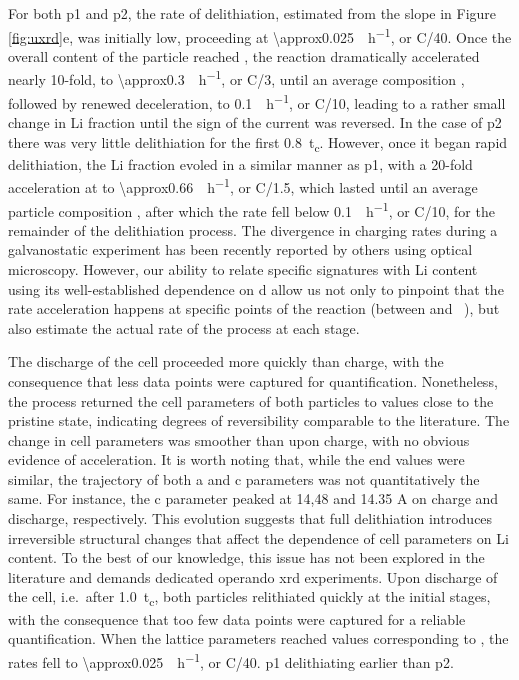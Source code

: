 \documentclass{article}
\begin{document}
For both \gls{p1} and \gls{p2}, the rate of delithiation, estimated
from the slope in Figure \ref{fig:uxrd}e, was initially low,
proceeding at \SI{\approx0.025}{\per\hour}, or C/40. Once the
overall content of the particle reached , the reaction
dramatically accelerated nearly 10-fold, to
\SI{\approx0.3}{\per\hour}, or C/3, until an average
composition , followed by renewed deceleration, to
\SI{0.1}{\per\hour}, or C/10, leading to a rather small change
in Li fraction until the sign of the current was reversed. In the case
of \gls{p2} there was very little delithiation for the first
\SI{0.8}{t_c}. However, once it began rapid delithiation, the Li
fraction evoled in a similar manner as \gls{p1}, with a 20-fold
acceleration at  to \SI{\approx0.66}{\per\hour}, or
C/1.5, which lasted until an average particle composition ,
after which the rate fell below \SI{0.1}{\per\hour}, or C/10,
for the remainder of the delithiation process. The divergence in
charging rates during a galvanostatic experiment has been recently
reported by others using optical microscopy\cite{zhao2022}. However, our ability to
relate specific signatures with Li content using its well-established
dependence on \gls{d} allow us not only to pinpoint that the rate
acceleration happens at specific points of the reaction (between
 and ~), but also estimate the actual rate of the
process at each stage.

The discharge of the cell proceeded more quickly than charge, with the
consequence that less data points were captured for
quantification. Nonetheless, the process returned the cell parameters
of both particles to values close to the pristine state, indicating
degrees of reversibility comparable to the
literature.\cite{robert2015} The change in cell parameters was
smoother than upon charge, with no obvious evidence of
acceleration. It is worth noting that, while the end values were
similar, the trajectory of both a and c parameters was not
quantitatively the same. For instance, the c parameter peaked at 14,48
and 14.35 A on charge and discharge, respectively. This evolution
suggests that full delithiation introduces irreversible structural
changes that affect the dependence of cell parameters on Li
content. To the best of our knowledge, this issue has not been
explored in the literature and demands dedicated operando \gls{xrd}
experiments. Upon discharge of the cell, i.e.\ after \SI{1.0}{t_c},
both particles relithiated quickly at the initial stages, with the
consequence that too few data points were captured for a reliable
quantification. When the lattice parameters reached values
corresponding to , the rates fell to
\SI{\approx0.025}{\per\hour}, or C/40.  \gls{p1} delithiating earlier than \gls{p2}.
\end{document}
